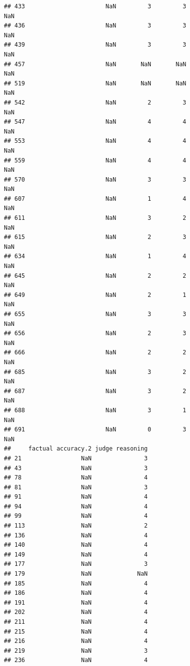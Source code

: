 \documentclass[
]{article}
\begin{document}
\begin{verbatim}
## 433                       NaN         3         3                NaN
## 436                       NaN         3         3                NaN
## 439                       NaN         3         3                NaN
## 457                       NaN       NaN       NaN                NaN
## 519                       NaN       NaN       NaN                NaN
## 542                       NaN         2         3                NaN
## 547                       NaN         4         4                NaN
## 553                       NaN         4         4                NaN
## 559                       NaN         4         4                NaN
## 570                       NaN         3         3                NaN
## 607                       NaN         1         4                NaN
## 611                       NaN         3         2                NaN
## 615                       NaN         2         3                NaN
## 634                       NaN         1         4                NaN
## 645                       NaN         2         2                NaN
## 649                       NaN         2         1                NaN
## 655                       NaN         3         3                NaN
## 656                       NaN         2         3                NaN
## 666                       NaN         2         2                NaN
## 685                       NaN         3         2                NaN
## 687                       NaN         3         2                NaN
## 688                       NaN         3         1                NaN
## 691                       NaN         0         3                NaN
##     factual accuracy.2 judge reasoning
## 21                 NaN               3
## 43                 NaN               3
## 78                 NaN               4
## 81                 NaN               3
## 91                 NaN               4
## 94                 NaN               4
## 99                 NaN               4
## 113                NaN               2
## 136                NaN               4
## 140                NaN               4
## 149                NaN               4
## 177                NaN               3
## 179                NaN             NaN
## 185                NaN               4
## 186                NaN               4
## 191                NaN               4
## 202                NaN               4
## 211                NaN               4
## 215                NaN               4
## 216                NaN               4
## 219                NaN               3
## 236                NaN               4

\end{verbatim}
\end{document}

